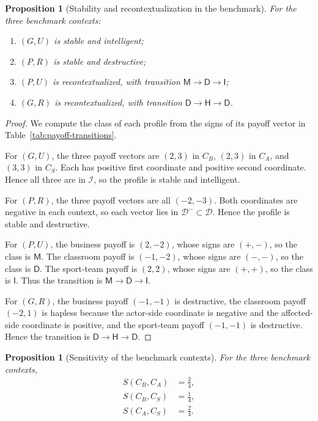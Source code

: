 \documentclass[a4paper,fleqn]{cas-dc}
\newtheorem{proposition}[definition]{Proposition}
\theoremstyle{remark}
\newcommand{\Iclass}{\mathsf{I}}
\newcommand{\Hclass}{\mathsf{H}}
\newcommand{\Mclass}{\mathsf{M}}
\newcommand{\Dclass}{\mathsf{D}}
\begin{document}
\begin{proposition}[Stability and recontextualization in the benchmark]
\label{prop:benchmark-stability}
For the three benchmark contexts:
\begin{enumerate}[label=(\alph*)]
\item $(G,U)$ is stable and intelligent;
\item $(P,R)$ is stable and destructive;
\item $(P,U)$ is recontextualized, with transition $\Mclass\to\Dclass\to\Iclass$;
\item $(G,R)$ is recontextualized, with transition $\Dclass\to\Hclass\to\Dclass$.
\end{enumerate}
\end{proposition}

\begin{proof}
We compute the class of each profile from the signs of its payoff vector in Table~\ref{tab:payoff-transitions}.

For $(G,U)$, the three payoff vectors are $(2,3)$ in $C_B$, $(2,3)$ in $C_A$, and $(3,3)$ in $C_S$. Each has positive first coordinate and positive second coordinate. Hence all three are in $\mathcal I$, so the profile is stable and intelligent.

For $(P,R)$, the three payoff vectors are all $(-2,-3)$. Both coordinates are negative in each context, so each vector lies in $\mathcal D^-\subset\mathcal D$. Hence the profile is stable and destructive.

For $(P,U)$, the business payoff is $(2,-2)$, whose signs are $(+,-)$, so the class is $\Mclass$. The classroom payoff is $(-1,-2)$, whose signs are $(-,-)$, so the class is $\Dclass$. The sport-team payoff is $(2,2)$, whose signs are $(+,+)$, so the class is $\Iclass$. Thus the transition is $\Mclass\to\Dclass\to\Iclass$.

For $(G,R)$, the business payoff $(-1,-1)$ is destructive, the classroom payoff $(-2,1)$ is hapless because the actor-side coordinate is negative and the affected-side coordinate is positive, and the sport-team payoff $(-1,-1)$ is destructive. Hence the transition is $\Dclass\to\Hclass\to\Dclass$.
\end{proof}


\begin{proposition}[Sensitivity of the benchmark contexts]
\label{prop:benchmark-sensitivity}
For the three benchmark contexts,
\[
\begin{aligned}
S(C_B,C_A)&=\frac{2}{4},\\
S(C_B,C_S)&=\frac{1}{4},\\
S(C_A,C_S)&=\frac{2}{4}.
\end{aligned}
\]
\end{proposition}
\end{document}
